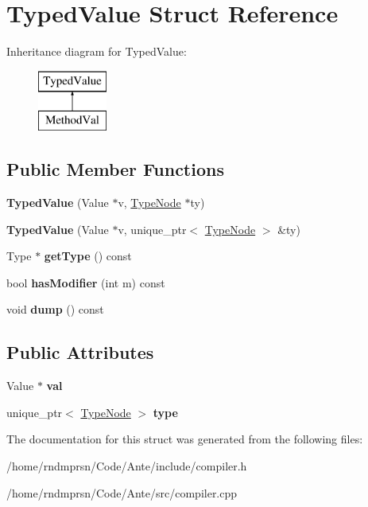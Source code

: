 \hypertarget{structTypedValue}{}\section{Typed\+Value Struct Reference}
\label{structTypedValue}
Inheritance diagram for Typed\+Value\+:\begin{figure}[H]
\begin{center}
\leavevmode
\includegraphics[height=2.000000cm]{structTypedValue}
\end{center}
\end{figure}
\subsection*{Public Member Functions}
\begin{DoxyCompactItemize}
\item 
\mbox{\label{structTypedValue_a6d4b500bb41a72d38da6ae2d35b65f96}} 
{\bfseries Typed\+Value} (Value $\ast$v, \hyperlink{structTypeNode}{Type\+Node} $\ast$ty)
\item 
\mbox{\label{structTypedValue_a51d0a91961b7f011c4f1eb017a784358}} 
{\bfseries Typed\+Value} (Value $\ast$v, unique\+\_\+ptr$<$ \hyperlink{structTypeNode}{Type\+Node} $>$ \&ty)
\item 
\mbox{\label{structTypedValue_a1963855af324d427335d40bb8c7de8d6}} 
Type $\ast$ {\bfseries get\+Type} () const
\item 
\mbox{\label{structTypedValue_af8d6267b024979a922dc0e923035c46d}} 
bool {\bfseries has\+Modifier} (int m) const
\item 
\mbox{\label{structTypedValue_a8d29edd52c3548609d3705b4bbb70e5e}} 
void {\bfseries dump} () const
\end{DoxyCompactItemize}
\subsection*{Public Attributes}
\begin{DoxyCompactItemize}
\item 
\mbox{\label{structTypedValue_a000a69ab8159d48d891acdb87d286919}} 
Value $\ast$ {\bfseries val}
\item 
\mbox{\label{structTypedValue_ae9750aee2108093267d7b1c625deecbb}} 
unique\+\_\+ptr$<$ \hyperlink{structTypeNode}{Type\+Node} $>$ {\bfseries type}
\end{DoxyCompactItemize}


The documentation for this struct was generated from the following files\+:\begin{DoxyCompactItemize}
\item 
/home/rndmprsn/\+Code/\+Ante/include/compiler.\+h\item 
/home/rndmprsn/\+Code/\+Ante/src/compiler.\+cpp\end{DoxyCompactItemize}
